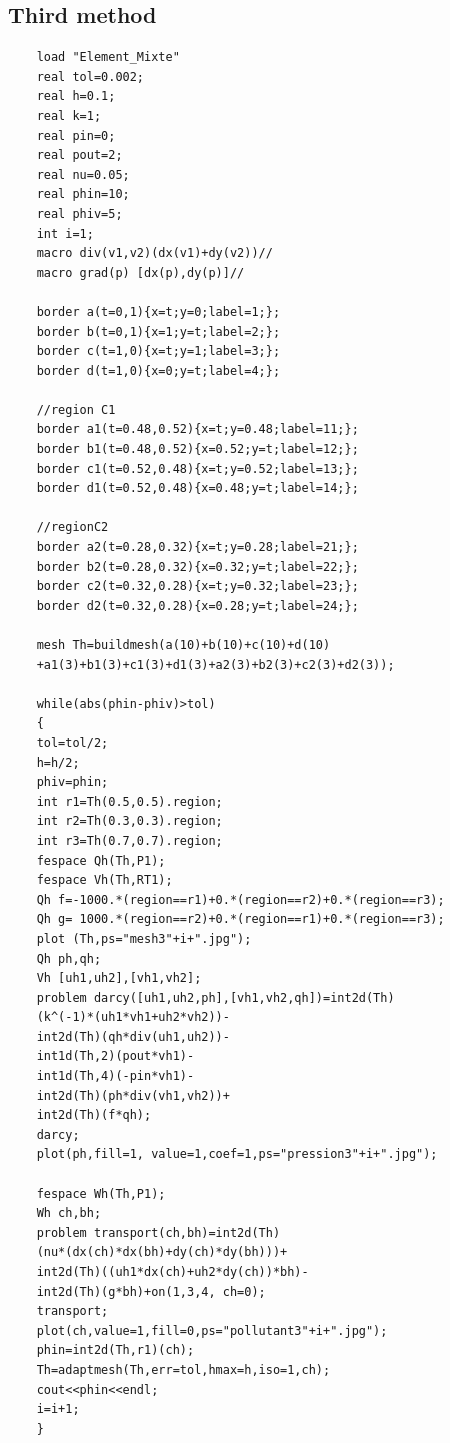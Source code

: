 \documentclass[]{report}
\begin{document}
\subsection{Third method}
\begin{lstlisting}
	load "Element_Mixte"
	real tol=0.002;
	real h=0.1;
	real k=1;
	real pin=0;
	real pout=2;
	real nu=0.05;
	real phin=10;
	real phiv=5;
	int i=1;
	macro div(v1,v2)(dx(v1)+dy(v2))//
	macro grad(p) [dx(p),dy(p)]//
	
	border a(t=0,1){x=t;y=0;label=1;};
	border b(t=0,1){x=1;y=t;label=2;};
	border c(t=1,0){x=t;y=1;label=3;};
	border d(t=1,0){x=0;y=t;label=4;};
	
	//region C1
	border a1(t=0.48,0.52){x=t;y=0.48;label=11;};
	border b1(t=0.48,0.52){x=0.52;y=t;label=12;};
	border c1(t=0.52,0.48){x=t;y=0.52;label=13;};
	border d1(t=0.52,0.48){x=0.48;y=t;label=14;};
	
	//regionC2
	border a2(t=0.28,0.32){x=t;y=0.28;label=21;};
	border b2(t=0.28,0.32){x=0.32;y=t;label=22;};
	border c2(t=0.32,0.28){x=t;y=0.32;label=23;};
	border d2(t=0.32,0.28){x=0.28;y=t;label=24;};
	
	mesh Th=buildmesh(a(10)+b(10)+c(10)+d(10)
	+a1(3)+b1(3)+c1(3)+d1(3)+a2(3)+b2(3)+c2(3)+d2(3));
	
	while(abs(phin-phiv)>tol)
	{
	tol=tol/2;
	h=h/2;
	phiv=phin;
	int r1=Th(0.5,0.5).region;
	int r2=Th(0.3,0.3).region;
	int r3=Th(0.7,0.7).region;
	fespace Qh(Th,P1);
	fespace Vh(Th,RT1);
	Qh f=-1000.*(region==r1)+0.*(region==r2)+0.*(region==r3);
	Qh g= 1000.*(region==r2)+0.*(region==r1)+0.*(region==r3);
	plot (Th,ps="mesh3"+i+".jpg");
	Qh ph,qh;
	Vh [uh1,uh2],[vh1,vh2];
	problem darcy([uh1,uh2,ph],[vh1,vh2,qh])=int2d(Th)
	(k^(-1)*(uh1*vh1+uh2*vh2))-
	int2d(Th)(qh*div(uh1,uh2))-
	int1d(Th,2)(pout*vh1)-
	int1d(Th,4)(-pin*vh1)-
	int2d(Th)(ph*div(vh1,vh2))+
	int2d(Th)(f*qh);
	darcy;
	plot(ph,fill=1, value=1,coef=1,ps="pression3"+i+".jpg");
	
	fespace Wh(Th,P1);
	Wh ch,bh;
	problem transport(ch,bh)=int2d(Th)
	(nu*(dx(ch)*dx(bh)+dy(ch)*dy(bh)))+
	int2d(Th)((uh1*dx(ch)+uh2*dy(ch))*bh)-
	int2d(Th)(g*bh)+on(1,3,4, ch=0);
	transport;
	plot(ch,value=1,fill=0,ps="pollutant3"+i+".jpg");
	phin=int2d(Th,r1)(ch);
	Th=adaptmesh(Th,err=tol,hmax=h,iso=1,ch);
	cout<<phin<<endl;
	i=i+1;
	}
\end{lstlisting}
\end{document}
